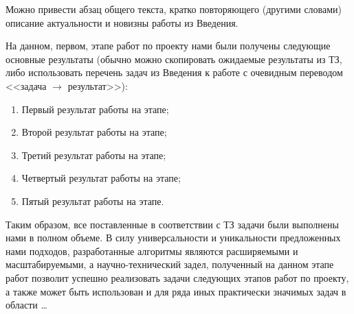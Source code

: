 Можно привести абзац общего текста, кратко повторяющего (другими словами) описание актуальности и новизны работы из Введения.

На данном, первом, этапе работ по проекту нами были получены следующие основные результаты (обычно можно скопировать ожидаемые результаты из ТЗ, либо использовать перечень задач из Введения к работе с очевидным переводом <<задача $\rightarrow$ результат>>):
\begin{enumerate}
	\item Первый результат работы на этапе;
	\item Второй результат работы на этапе;
	\item Третий результат работы на этапе;
	\item Четвертый результат работы на этапе;
	\item Пятый результат работы на этапе.
\end{enumerate}

Таким образом, все поставленные в соответствии с ТЗ задачи были выполнены нами в полном объеме.
В силу универсальности и уникальности предложенных нами подходов, разработанные алгоритмы являются расширяемыми и масштабируемыми, а научно-технический задел, полученный на данном этапе работ позволит успешно реализовать задачи следующих этапов работ по проекту, а также может быть использован и для ряда иных практически значимых задач в области \ldots
